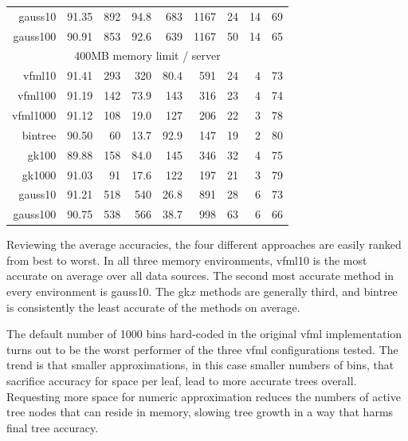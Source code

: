 \begin{table}
\begin{tabular}{|r|r|r|r|r|r|r|r|r|}
{\sc gauss10} & 91.35 & 892 & 94.8 & 683 & 1167 & 24 & 14 & 69 \\
{\sc gauss100} & 90.91 & 853 & 92.6 & 639 & 1167 & 50 & 14 & 65 \\
\hline
\multicolumn{9}{|c|}{400MB memory limit / server} \\
\hline
{\sc vfml10} & 91.41 & 293 & 320 & 80.4 & 591 & 24 & 4 & 73 \\
{\sc vfml100} & 91.19 & 142 & 73.9 & 143 & 316 & 23 & 4 & 74 \\
{\sc vfml1000} & 91.12 & 108 & 19.0 & 127 & 206 & 22 & 3 & 78 \\
{\sc bintree} & 90.50 & 60 & 13.7 & 92.9 & 147 & 19 & 2 & 80 \\
{\sc gk100} & 89.88 & 158 & 84.0 & 145 & 346 & 32 & 4 & 75 \\
{\sc gk1000} & 91.03 & 91 & 17.6 & 122 & 197 & 21 & 3 & 79 \\
{\sc gauss10} & 91.21 & 518 & 540 & 26.8 & 891 & 28 & 6 & 73 \\
{\sc gauss100} & 90.75 & 538 & 566 & 38.7 & 998 & 63 & 6 & 66 \\
\hline
\end{tabular}
\end{table}

Reviewing the average accuracies, the four different approaches are easily ranked from best to worst. In all three memory environments, {\sc vfml10} is the most accurate on average over all data sources. The second most accurate method in every environment is {\sc gauss10}. The {\sc gk}$x$ methods are generally third, and {\sc bintree} is consistently the least accurate of the methods on average.

The default number of 1000 bins hard-coded in the original {\sc vfml} implementation turns out to be the worst performer of the three {\sc vfml} configurations tested. The trend is that smaller approximations, in this case smaller numbers of bins, that sacrifice accuracy for space per leaf, lead to more accurate trees overall. Requesting more space for numeric approximation reduces the numbers of active tree nodes that can reside in memory, slowing tree growth in a way that harms final tree accuracy.

